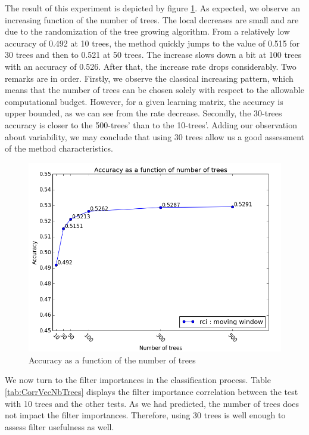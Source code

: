 \documentclass[a4paper]{report}
\begin{document}
		The result of this experiment is depicted by figure \ref{fig:accFnbTrees}. As expected, we observe an increasing function of the number of trees. The local decreases are small and are due to the randomization of the tree growing algorithm. From a relatively low accuracy of 0.492 at 10 trees, the method quickly jumps to the value of 0.515 for 30 trees and then to 0.521 at 50 trees. The increase slows down a bit at 100 trees with an accuracy of 0.526. After that, the increase rate drops considerably. Two remarks are in order. Firstly, we observe the classical increasing pattern, which means that the number of trees can be chosen solely with respect to the allowable computational budget. However, for a given learning matrix, the accuracy is upper bounded, as we can see from the rate decrease. Secondly, the 30-trees accuracy is closer to the 500-trees' than to the 10-trees'. Adding our observation about variability, we may conclude that using 30 trees allow us a good assessment of the method characteristics. 
		\begin{figure}
			\centering
				\includegraphics[width=1.0\textwidth]{images/accFnbTrees.png}
			\caption{\label{fig:accFnbTrees}Accuracy as a function of the number of trees}
		\end{figure}
		
		
		\par
		We now turn to the filter importances in the classification process. Table \ref{tab:CorrVecNbTrees} displays the filter importance correlation between the test with 10 trees and the other tests. As we had predicted, the number of trees does not impact the filter importances. Therefore, using 30 trees is well enough to assess filter usefulness as well.
		
\end{document}
